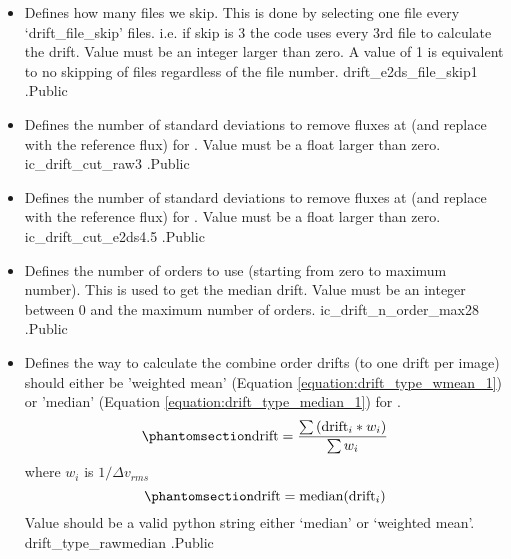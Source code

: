 \begin{itemize}
\item {}
{Defines how many files we skip. This is done by selecting one file every `drift\_file\_skip' files. i.e. if skip is 3 the code uses every 3rd file to calculate the drift. Value must be an integer larger than zero. A value of 1 is equivalent to no skipping of files regardless of the file number.}
{drift\_e2ds\_file\_skip}{1}
{\calDRIFTE}{\constantsfile}{\calDRIFTE.\progMAIN}{Public}


\item {}
{Defines the number of standard deviations to remove fluxes at (and replace with the reference flux) for \calDRIFTRAW. Value must be a float larger than zero.}
{ic\_drift\_cut\_raw}{3}
{\calDRIFTRAW}{\constantsfile}{\calDRIFTRAW.\progMAIN}{Public}


\item {}
{Defines the number of standard deviations to remove fluxes at (and replace with the reference flux) for \calDRIFTE. Value must be a float larger than zero.}
{ic\_drift\_cut\_e2ds}{4.5}
{\calDRIFTE}{\constantsfile}{\calDRIFTE.\progMAIN}{Public}


\item {}
{Defines the number of orders to use (starting from zero to maximum number). This is used to get the median drift. Value must be an integer between 0 and the maximum number of orders.}
{ic\_drift\_n\_order\_max}{28}
{\calDRIFTRAW}{\constantsfile}{\calDRIFTRAW.\progMAIN}{Public}


\item {}
{Defines the way to calculate the combine order drifts (to one drift per image) should either be 'weighted mean' (Equation \ref{equation:drift_type_wmean_1}) or 'median' (Equation \ref{equation:drift_type_median_1}) for \calDRIFTRAW.
\begin{equation}
\namedlabel{equation:drift_type_wmean_1}
\text{drift} = \frac{\sum{(\text{drift}_i * w_i)}}{\sum{w_i}}
\end{equation}
\noindent where $w_i$ is $1/\Delta v_{rms}$
\begin{equation}
\namedlabel{equation:drift_type_median_1}
\text{drift} = \text{median}(\text{drift}_i)
\end{equation}
\noindent Value should be a valid python string either `median' or `weighted mean'.
}
{drift\_type\_raw}{median}
{\calDRIFTRAW}{\constantsfile}{\calDRIFTRAW.\progMAIN}{Public}



\end{itemize}
